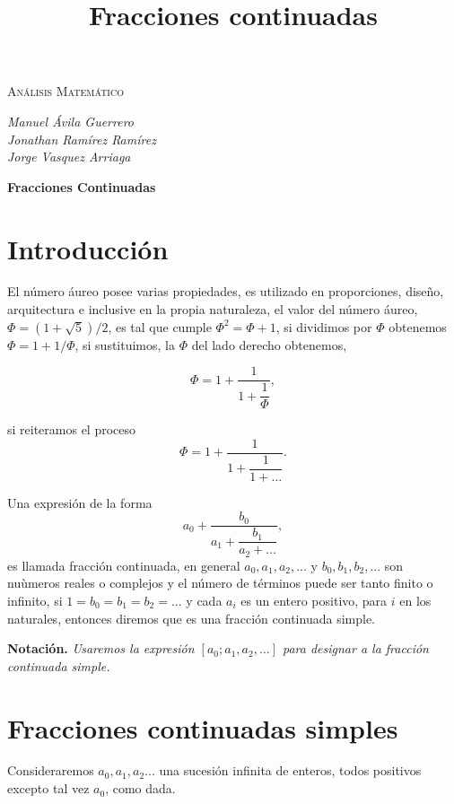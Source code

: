 \documentclass[11pt, article]{article}
\title{Fracciones continuadas}
\author{}
\date{}
\begin{document}
    \begin{center}
    {\scshape\LARGE Análisis Matemático \par}

    \vspace{0.5cm}
    \large{\itshape{Manuel Ávila Guerrero}}  \\ 
    \large{\itshape{Jonathan Ramírez Ramírez}}  \\
    \large{\itshape{Jorge Vasquez Arriaga}} \\

    {\LARGE \textbf{Fracciones Continuadas} \par}
    \end{center}


\section*{Introducción}
    El número áureo posee varias propiedades, es utilizado en proporciones, diseño, arquitectura e inclusive en la propia naturaleza, el valor del número áureo, $\Phi=(1 + \sqrt{5})/2$, es tal que  cumple $\Phi^2=\Phi + 1$, si dividimos por $\Phi$ obtenemos $\Phi=1+1/\Phi$, si sustituimos, la $\Phi$ del lado derecho obtenemos, 
    
    \[\Phi = 1 + \dfrac{1}{1 + \dfrac{1}{\Phi}},\]

    si reiteramos el proceso 
    \[
        \Phi=1+\dfrac{1}{1+\dfrac{1}{1+\dots}}.
    \]
    
    Una expresión de la forma 
    \[
        a_0 + \dfrac{b_0}{a_1+ \dfrac{b_1}{a_2+\dots}},
    \]
    es llamada fracción continuada, en general $a_0, a_1,a_2,...$ y $b_0, b_1,b_2,...$ son nuùmeros reales o complejos y el número de términos puede ser tanto finito o infinito, si $1=b_0=b_1=b_2=...$ y cada $a_i$ es un entero positivo, para $i$ en los naturales, entonces diremos que es una fracción continuada simple.
    
    \textbf{Notación.} \textit{Usaremos la expresión $[a_0;a_1,a_2, \dots]$ para designar a la fracción continuada simple.}
    
\section*{Fracciones continuadas simples}
    Consideraremos $a_0,a_1,a_2...$ una sucesión infinita de enteros, todos positivos excepto tal vez $a_0$, como dada.
    
\end{document}
